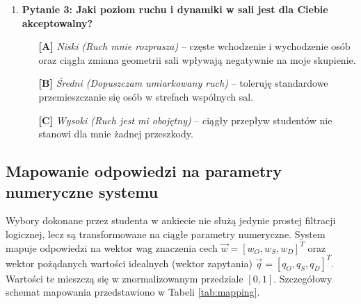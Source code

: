 \documentclass[14pt,a4paper]{extarticle}
\begin{document}
\begin{enumerate}
    \item \textbf{Pytanie 3: Jaki poziom ruchu i dynamiki w sali jest dla Ciebie akceptowalny?}
    \begin{itemize}
        \item[\textbf{[A]}] \textit{Niski (Ruch mnie rozprasza)} -- częste wchodzenie i wychodzenie osób oraz ciągła zmiana geometrii sali wpływają negatywnie na moje skupienie.
        \item[\textbf{[B]}] \textit{Średni (Dopuszczam umiarkowany ruch)} -- toleruję standardowe przemieszczanie się osób w strefach wspólnych sal.
        \item[\textbf{[C]}] \textit{Wysoki (Ruch jest mi obojętny)} -- ciągły przepływ studentów nie stanowi dla mnie żadnej przeszkody.
    \end{itemize}
\end{enumerate}

\subsection{Mapowanie odpowiedzi na parametry numeryczne systemu}
Wybory dokonane przez studenta w ankiecie nie służą jedynie prostej filtracji logicznej, lecz są transformowane na ciągłe parametry numeryczne. System mapuje odpowiedzi na wektor wag znaczenia cech $\vec{w} = [w_O, w_S, w_D]^T$ oraz wektor pożądanych wartości idealnych (wektor zapytania) $\vec{q} = [q_O, q_S, q_D]^T$. Wartości te mieszczą się w znormalizowanym przedziale $[0, 1]$. Szczegółowy schemat mapowania przedstawiono w Tabeli \ref{tab:mapping}.
\begin{table}[H]
\centering
\caption{Schemat mapowania odpowiedzi z ankiety na wagi cech i wektor zapytania.}
\label{tab:mapping}
\end{table}
\end{document}
